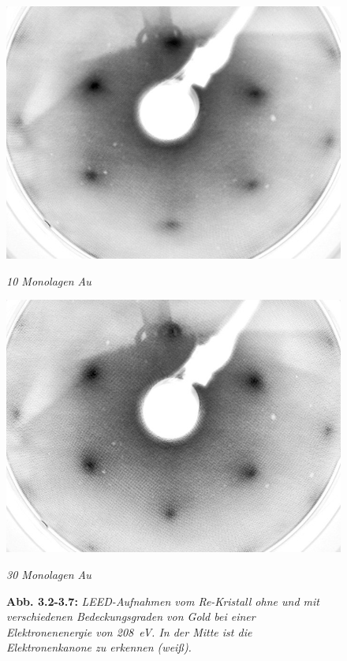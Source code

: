 \begin{figure}[H]
	\begin{minipage}[b]{0.5\textwidth} 
		\includegraphics[width=\textwidth]{LEED-Bilder/bearbeitet/10ML_E207}
		\caption{\textit{10 Monolagen Au}}
		\label{10ML} 
	\end{minipage}
	\hfill
	\begin{minipage}[b]{0.5\textwidth}
		\includegraphics[width=\textwidth]{LEED-Bilder/bearbeitet/30ML_E208}
		\caption{\textit{30 Monolagen Au}}
		\label{30ML} 
	\end{minipage}
	\caption*{\textbf{Abb. 3.2-3.7:} \textit{LEED-Aufnahmen vom Re-Kristall ohne und mit
	verschiedenen Bedeckungsgraden von Gold bei einer Elektronenenergie von \SI{208}{eV}. In
	der Mitte ist die Elektronenkanone zu erkennen (weiß).}}
\end{figure}


